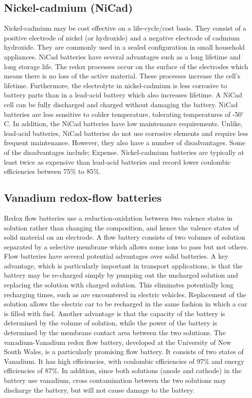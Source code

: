 {\subsection{Nickel-cadmium (NiCad)}
Nickel-cadmium may be cost effective on a life-cycle/cost basis. They consist of a positive electrode of nickel (or hydroxide) and a negative electrode of cadmium hydroxide. They are commonly used in a sealed configuration in small household appliances. NiCad batteries have several advantages such as a long lifetime and long storage life. The redox processes occur on the surface of the electrodes which means there is no loss of the active material. These processes increase the cell's lifetime. Furthermore, the electrolyte in nickel-cadmium is less corrosive to battery parts than in a lead-acid battery which also increases lifetime. A NiCad cell can be fully discharged and charged without damaging the battery. NiCad batteries are less sensitive to colder temperature, tolerating temperatures of -50$^{\circ}$C. In addition, the NiCad batteries have low maintenance requirements. Unlike, lead-acid batteries, NiCad batteries do not use corrosive elements and require less frequent maintenance. However, they also have a number of disadvantages. Some of the disadvantages include; Expense. Nickel-cadmium batteries are typically at least twice as expensive than lead-acid batteries and record lower coulombic efficiencies between 75\% to 85\%.

\subsection{Vanadium redox-flow batteries}
 Redox flow batteries use a reduction-oxidation between two valence states in solution rather than changing the composition, and hence the valence states of solid material on an electrode. A flow battery consists of two volumes of solution separated by a selective membrane which allows some ions to pass but not others. Flow batteries have several potential advantages over solid batteries. A key advantage, which is particularly important in transport applications, is that the battery may be re-charged simply by pumping out the uncharged solution and replacing the solution with charged solution. This eliminates potentially long recharging times, such as are encountered in electric vehicles. Replacement of the solution allows the electric car to be recharged in the same fashion in which a car is filled with fuel. Another advantage is that the capacity of the battery is determined by the volume of solution, while the power of the battery is determined by the membrane contact area between the two solutions. The vanadium-Vanadium redox flow battery, developed at the University of New South Wales, is a particularly promising flow battery. It consists of two states of Vanadium. It has high efficiencies, with coulombic efficiencies of 97\% and energy efficiencies of 87\%. In addition, since both solutions (anode and cathode) in the battery use vanadium, cross contamination between the two solutions may discharge the battery, but will not cause damage to the battery.
 
}
